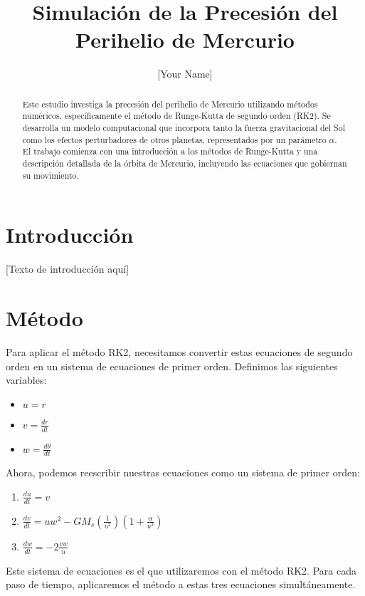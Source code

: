 \documentclass[twocolumn]{article}
\title{Simulación de la Precesión del Perihelio de Mercurio}
\author{[Your Name]}
\date{}
\begin{document}
\maketitle

\begin{abstract}
Este estudio investiga la precesión del perihelio de Mercurio utilizando métodos numéricos, específicamente el método de Runge-Kutta de segundo orden (RK2). Se desarrolla un modelo computacional que incorpora tanto la fuerza gravitacional del Sol como los efectos perturbadores de otros planetas, representados por un parámetro $\alpha$. El trabajo comienza con una introducción a los métodos de Runge-Kutta y una descripción detallada de la órbita de Mercurio, incluyendo las ecuaciones que gobiernan su movimiento.
\end{abstract}

\section{Introducción}
[Texto de introducción aquí]

\section{Método}

Para aplicar el método RK2, necesitamos convertir estas ecuaciones de segundo orden en un sistema de ecuaciones de primer orden. Definimos las siguientes variables:

\begin{itemize}
\item $u = r$
\item $v = \frac{dr}{dt}$
\item $w = \frac{d\theta}{dt}$
\end{itemize}

Ahora, podemos reescribir nuestras ecuaciones como un sistema de primer orden:

\begin{enumerate}
\item $\frac{du}{dt} = v$
\item $\frac{dv}{dt} = u w^2 - G M_s \left(\frac{1}{u^2}\right) \left(1 + \frac{\alpha}{u^2}\right)$
\item $\frac{dw}{dt} = -2 \frac{v w}{u}$
\end{enumerate}

Este sistema de ecuaciones es el que utilizaremos con el método RK2. Para cada paso de tiempo, aplicaremos el método a estas tres ecuaciones simultáneamente.
\end{document}
